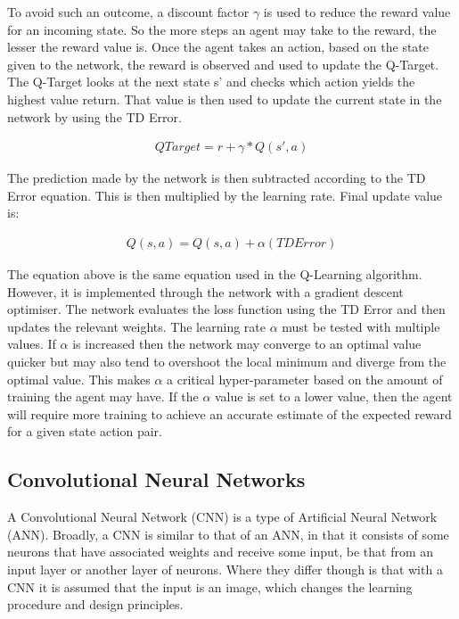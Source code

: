 To avoid such an outcome, a discount factor $\gamma$ is used to reduce
the reward value for an incoming state. So the more steps an agent may take to
the reward, the lesser the reward value is. Once the agent takes an action,
based on the state given to the network, the reward is observed and used to
update the Q-Target. The Q-Target looks at the next state s' and checks which
action yields the highest value return. That value is then used to update the
current state in the network by using the TD Error.

\begin{align}
    QTarget = r + \gamma*Q(s',a)
\end{align}

The prediction made by the network is then subtracted according to the TD Error
equation. This is then multiplied by the learning rate. Final update value
is:

\begin{align}
    Q(s,a) = Q(s,a) + \alpha (TDError)
\end{align}

The equation above is the same equation used in the Q-Learning algorithm.
However, it is
implemented through the network with a gradient descent optimiser. The network
evaluates the loss function using the TD Error and then updates the relevant
weights. The learning rate $\alpha$ must be tested with multiple values. If
$\alpha$ is increased then the network may converge to an optimal value quicker
but may also tend to overshoot the local minimum and diverge from the optimal
value. This makes $\alpha$ a critical hyper-parameter based on the amount of
training the agent may have. If the $\alpha$ value is set to a lower value, then
the agent will require more training to achieve an accurate estimate of the
expected reward for a given state action pair.

\subsection{Convolutional Neural Networks}

A Convolutional Neural Network (CNN) is a type of Artificial Neural Network
(ANN). Broadly, a CNN is similar to that of an ANN, in that it consists of some
neurons that have associated weights and receive some input, be that
from an input layer or another layer of neurons. Where they differ though is
that with a CNN it is assumed that the input is an image, which changes the
learning procedure and design principles.

